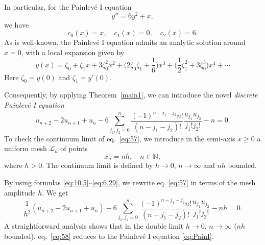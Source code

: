\documentclass[10pt]{amsart}
\numberwithin{equation}{section}
\theoremstyle{definition}
\begin{document}
In particular, for the Painlev\'e I equation
\begin{equation}
\label{eq:PainI}
y''=6y^{2}+x,
\end{equation}
we have
\begin{equation}
c_{0}(x)=x,\quad c_{1}(x)=0,\quad c_{2}(x)=6.
\label{eq10.25}
\end{equation}
As is well-known, the Painlev\'e I equation admits an analytic solution
around $x=0$, with a local expansion given by
\begin{equation}
y(x)= \zeta _{0} + \zeta _{1} x+3 \zeta _{0}^{2} x^{2}+ \Big(2 \zeta _{0}
\zeta _{1}+\frac{1}{6}\Big) x^{3}+ \Big(\frac{1}{2} \zeta _{1} ^{2}+ 3
\zeta _{0}^{3}\Big) x^{4} + \cdots
\label{eq10.26}
\end{equation}
Here $\zeta _{0}=y(0)$ and $\zeta _{1} = y'(0)$.

Consequently, by applying  Theorem~\ref{main1}, we can introduce the novel
\textit{discrete Painlev\'e I equation}
\begin{equation}
\label{eq:57}
u_{n+2}-2u_{n+1}+u_{n} - 6\sum _{j_{1},j_{2}=0}^{n}
\frac{(-1)^{n -j_{1}-j_{2} } n!}{ (n-j_{1}-j_{2})! }
\frac{u_{j_{1}}u_{j_{2}}}{j_{1}!j_{2}!} - n=0.
\end{equation}
To check the continuum limit of  eq.~\eqref{eq:57}, we introduce in the
semi-axis $x\ge 0$ a uniform mesh $\mathcal{L}_{h}$ of points
\begin{equation}
x_{n}=nh,\quad n\in \mathbb{N},
\label{eq10.28}
\end{equation}
where $h>0$. The continuum limit is defined by $h\to 0$,
$n\to \infty $ and $nh$ bounded.

By using formulas  \eqref{eq:10.5}--\eqref{eq:6.29}, we rewrite eq.
\eqref{eq:57} in terms of the mesh amplitude $h$. We get
\begin{equation}
\label{eq:58}
\frac{1}{h^{2}}\left (u_{n+2}-2u_{n+1}+u_{n}\right ) - 6\sum _{j_{1},j_{2}=0}^{n}
\frac{(-1)^{n -j_{1}-j_{2} } n!}{ (n-j_{1}-j_{2})! }
\frac{u_{j_{1}}u_{j_{2}}}{j_{1}!j_{2}!} - nh=0.
\end{equation}
A straightforward analysis shows that in the double limit $h\to 0$,
$n\to \infty $ ($nh$ bounded),  eq.~\eqref{eq:58} reduces to the Painlev\'e
I equation  \eqref{eq:PainI}.
\end{document}
